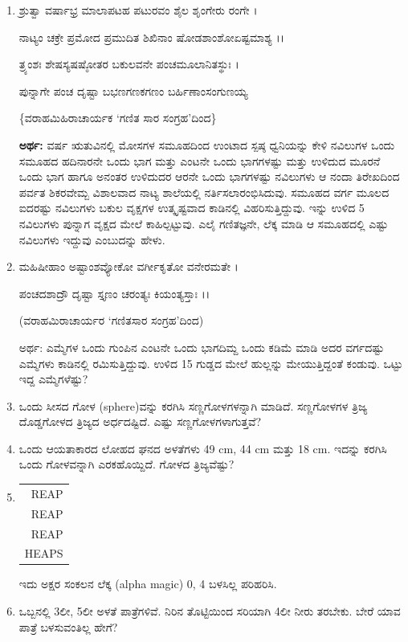 \begin{enumerate}
\item ಶ್ರುತ್ವಾ ವರ್ಷಾಭ್ರ ಮಾಲಾಪಟಹ ಪಟುರವಂ ಶೈಲ ಶೃಂಗೇರು ರಂಗೇ ।

ನಾಟ್ಯಂ ಚಕ್ರೇ ಪ್ರಮೋದ ಪ್ರಮುದಿತ ಶಿಖಿನಾಂ ಷೋಡಶಾಂಶೋಏಷ್ಟಮಾಶ್ಯ ।।

ತ್ರ್ಯಂಶಃ ಶೇಷಸ್ಯಷಷ್ಠೋತರ ಬಕುಲವನೇ ಪಂಚಮೂಲಾನಿತಸ್ಥುಃ ।

ಪುನ್ನಾಗೇ ಪಂಚ ದೃಷ್ಟಾ ಬಭಣಗಣಕಗಣಂ ಬರ್ಹಿಣಾಂಸಂಗುಣಯ್ಯ 

\hfill \{ವರಾಹಮಿಹಿರಾಚಾರ್ಯಕ `ಗಣಿತ ಸಾರ ಸಂಗ್ರಹ'ದಿಂದ\}

{\bf ಅರ್ಥ:} ವರ್ಷ ಋತುವಿನಲ್ಲಿ ಮೋಸಗಳ ಸಮೂಹದಿಂದ ಉಂಟಾದ ಸ್ಪಷ್ಠ ಧ್ವನಿಯನ್ನು ಕೇಳಿ ನವಿಲುಗಳ ಒಂದು ಸಮೂಹದ ಹದಿನಾರನೇ ಒಂದು ಭಾಗ ಮತ್ತು ಎಂಟನೇ ಒಂದು ಭಾಗಗಳಷ್ಟು ಮತ್ತು ಉಳಿದುದ ಮೂರನೆ ಒಂದು ಭಾಗ ಹಾಗೂ ಅನಂತರ ಉಳಿದುದರ ಆರನೇ ಒಂದು ಭಾಗಗಳಷ್ಟು ನವಿಲುಗಳು ಆ ನಂದಾ ತಿರೇಖದಿಂದ ಪರ್ವತ ಶಿಕರವೇಮ್ಬ ವಿಶಾಲವಾದ ನಾಟ್ಯ ಶಾಲೆಯಲ್ಲಿ ನರ್ತಿಸಲಾರಂಭಿಸಿದುವು. ಸಮೂಹದ ವರ್ಗ ಮೂಲದ ಐದರಷ್ಟು ನವಿಲುಗಳು ಬಕುಲ ವೃಕ್ಷಗಳ ಉತ್ಕೃಷ್ಟವಾದ ಕಾಡಿನಲ್ಲಿ ವಿಹರಿಸುತ್ತಿದ್ದುವು. ಇನ್ನು ಉಳಿದ 5 ನವಿಲುಗಳು ಪುನ್ನಾಗ ವೃಕ್ಷದ ಮೇಲೆ ಕಾಹಿಲ್ಪಟ್ಟುವು. ಎಲೈ ಗಣಿತಜ್ಞನೇ, ಲೆಕ್ಕ ಮಾಡಿ ಆ ಸಮೂಹದಲ್ಲಿ ಎಷ್ಟು ನವಿಲುಗಳು ಇದ್ದುವು ಎಂಬುದನ್ನು ಹೇಳು.  

\item ಮಹಿಷೀಹಾಂ ಅಷ್ಟಾಂಶವ್ಯೋಕೋ ವರ್ಗೀಕೃತೋ ವನೇರಮತೇ ।

ಪಂಚದಶಾದ್ರೌ ದೃಷ್ಟಾ ಸ್ತೃಣಂ ಚರಂತ್ಯಃ ಕಿಯಂತ್ಯಸ್ತಾಃ ।।

\hfill (ವರಾಹಮಿರಾಚಾರ್ಯರ `ಗಣಿತಸಾರ ಸಂಗ್ರಹ'ದಿಂದ)

ಅರ್ಥ: ಎಮ್ಮೆಗಳ ಒಂದು ಗುಂಪಿನ ಎಂಟನೇ ಒಂದು ಭಾಗದಿಮ್ದ ಒಂದು ಕಡಿಮೆ ಮಾಡಿ ಅದರ ವರ್ಗದಷ್ಟು ಎಮ್ಮೆಗಳು ಕಾಡಿನಲ್ಲಿ ರಮಿಸುತ್ತಿದ್ದುವು. ಉಳಿದ 15 ಗುಡ್ಡದ ಮೇಲೆ ಹುಲ್ಲನ್ನು ಮೇಯುತ್ತಿದ್ದಂತೆ ಕಂಡುವು. ಒಟ್ಟು ಇದ್ದ ಎಮ್ಮೆಗಳೆಷ್ಟು? 

\item ಒಂದು ಸೀಸದ ಗೋಳ (sphere)ವನ್ನು ಕರಗಿಸಿ ಸಣ್ಣಗೋಳಗಳನ್ನಾಗಿ ಮಾಡಿದೆ. ಸಣ್ಣಗೋಳಗಳ ತ್ರಿಜ್ಯ ದೊಡ್ಡಗೋಳದ ತ್ರಿಜ್ಯದ ಅರ್ಧದಷ್ಟಿದೆ. ಎಷ್ಟು ಸಣ್ಣಗೋಳಗಳಾಗುತ್ತವೆ? 

\item ಒಂದು ಆಯತಾಕಾರದ ಲೋಹದ ಘನದ ಅಳತೆಗಳು 49 cm, 44 cm ಮತ್ತು 18 cm. ಇದನ್ನು ಕರಗಿಸಿ ಒಂದು ಗೋಳವನ್ನಾಗಿ ಎರಕಹೊಯ್ದಿದೆ. ಗೋಳದ ತ್ರಿಜ್ಯವೆಷ್ಟು? 

\item 
\begin{tabular}[t]{r}
REAP\\
REAP\\
REAP\\
\hline
HEAPS
\end{tabular}

ಇದು ಅಕ್ಷರ ಸಂಕಲನ ಲೆಕ್ಕ (alpha magic) 0, 4 ಬಳಸಿಲ್ಲ ಪರಿಹರಿಸಿ. 

\item ಒಬ್ಬನಲ್ಲಿ 3ಲೀ, 5ಲೀ ಅಳತೆ ಪಾತ್ರೆಗಳಿವೆ. ನಿರಿನ ತೊಟ್ಟಿಯಿಂದ ಸರಿಯಾಗಿ 4ಲೀ ನೀರು ತರಬೇಕು. ಬೇರೆ ಯಾವ ಪಾತ್ರೆ ಬಳಸುವಂತಿಲ್ಲ ಹೇಗೆ?  


\end{enumerate}

